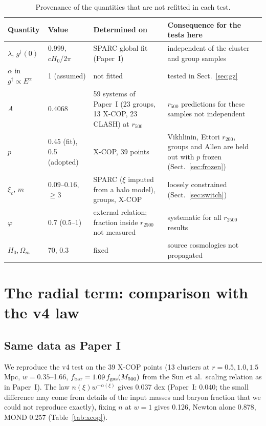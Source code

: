 \documentclass[11pt,a4paper]{article}
\newcommand{\gdag}{g^{\dagger}}
\newcommand{\fgas}{f_{\rm gas}}
\begin{document}
\begin{table}[h]
\centering\footnotesize\setlength{\tabcolsep}{3pt}
\begin{tabular}{p{2.4cm}p{2.6cm}p{4.3cm}p{4.9cm}}
\toprule
Quantity & Value & Determined on & Consequence for the tests here \\
\midrule
$\lambda$, $\gdag(0)$ & 0.999, $cH_0/2\pi$ & SPARC global fit (Paper~I) & independent of the cluster and group samples \\
$\alpha$ in $\gdag\propto E^\alpha$ & 1 (assumed) & not fitted & tested in Sect.~\ref{sec:gz} \\
$A$ & 0.4068 & 59 systems of Paper~I (23 groups, 13 X-COP, 23 CLASH) at $r_{500}$ & $r_{500}$ predictions for these samples not independent \\
$p$ & 0.45 (fit), 0.5 (adopted) & X-COP, 39 points & Vikhlinin, Ettori $r_{200}$, groups and Allen are held out with $p$ frozen (Sect.~\ref{sec:frozen}) \\
$\xi_c$, $m$ & $0.09$--$0.16$, $\ge3$ & SPARC ($\xi$ imputed from a halo model), groups, X-COP & loosely constrained (Sect.~\ref{sec:switch}) \\
$\varphi$ & 0.7 (0.5--1) & external relation; fraction inside $r_{2500}$ not measured & systematic for all $r_{2500}$ results \\
$H_0,\Omega_m$ & 70, 0.3 & fixed & source cosmologies not propagated \\
\bottomrule
\end{tabular}
\caption{Provenance of the quantities that are not refitted in each test.}
\label{tab:prov}
\end{table}


\section{The radial term: comparison with the v4 law}
\label{sec:radial}
\subsection{Same data as Paper I}
We reproduce the v4 test on the 39 X-COP points (13 clusters at $r=0.5,1.0,1.5$ Mpc, $w=0.35$--1.66, $f_{\rm bar}=1.09\,\fgas(M_{500})$ from the Sun et al.\ scaling relation as in Paper~I). The law $n(\xi)w^{-\alpha(\xi)}$ gives 0.037 dex (Paper~I: 0.040; the small difference may come from details of the input masses and baryon fraction that we could not reproduce exactly), fixing $n$ at $w=1$ gives 0.126, Newton alone 0.878, MOND 0.257 (Table~\ref{tab:xcop}).
\end{document}
